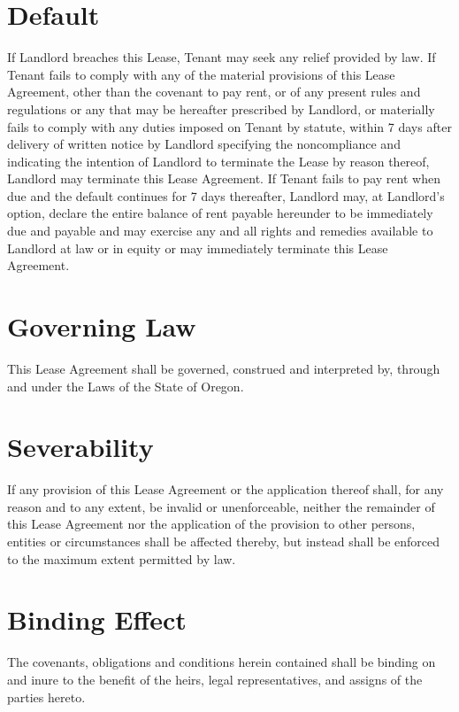 \documentclass{amsart}
\begin{document}
\section{Default}
If Landlord breaches this Lease, Tenant may seek any relief provided by law. If
Tenant fails to comply with any of the material provisions of this  Lease
Agreement, other than the covenant to pay rent, or of any present rules and
regulations or any that may be hereafter prescribed by Landlord, or materially
fails to comply with any duties imposed on Tenant by statute, within 7 days
after delivery of written notice by Landlord specifying the noncompliance and
indicating the intention of Landlord to terminate the Lease by reason thereof,
Landlord may terminate this Lease Agreement. If Tenant fails to pay rent when
due and the default continues for 7 days thereafter, Landlord may, at Landlord's
option, declare the entire balance of rent payable hereunder to be immediately
due and payable and may exercise any and all rights and remedies available to
Landlord at law or in equity or may immediately terminate this Lease Agreement.
\section{Governing Law}
This Lease Agreement shall be governed, construed and interpreted by, through
and under the Laws of the State of Oregon.
\section{Severability}
If any provision of this  Lease Agreement or the application thereof shall, for
any reason and to any extent, be invalid or unenforceable, neither the remainder
of this Lease Agreement nor the application of the provision to other persons,
entities or circumstances shall be affected thereby, but instead shall be
enforced to the maximum extent permitted by law.
\section{Binding Effect}
The covenants, obligations and conditions herein contained shall be binding on
and inure to the benefit of the heirs, legal representatives, and assigns of the
parties hereto.
\end{document}
